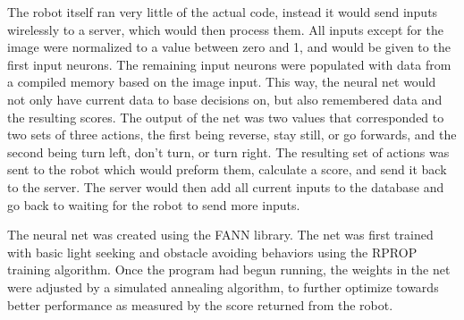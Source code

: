 \documentclass{report}
\begin{document}
The robot itself ran very little of the actual code, instead it would send inputs wirelessly to a server, which would then process them. All inputs except for the image were normalized to a value between zero and 1, and would be given to the first input neurons. The remaining input neurons were populated with data from a compiled memory based on the image input. This way, the neural net would not only have current data to base decisions on, but also remembered data and the resulting scores. The output of the net was two values that corresponded to two sets of three actions, the first being reverse, stay still, or go forwards, and the second being turn left, don't turn, or turn right. The resulting set of actions was sent to the robot which would preform them, calculate a score, and send it back to the server. The server would then add all current inputs to the database and go back to waiting for the robot to send more inputs. 

The neural net was created using the FANN library. The net was first trained with basic light seeking and obstacle avoiding behaviors using the RPROP training algorithm. Once the program had begun running, the weights in the net were adjusted by a simulated annealing algorithm, to further optimize towards better performance as measured by the score returned from the robot. 
\end{document}
